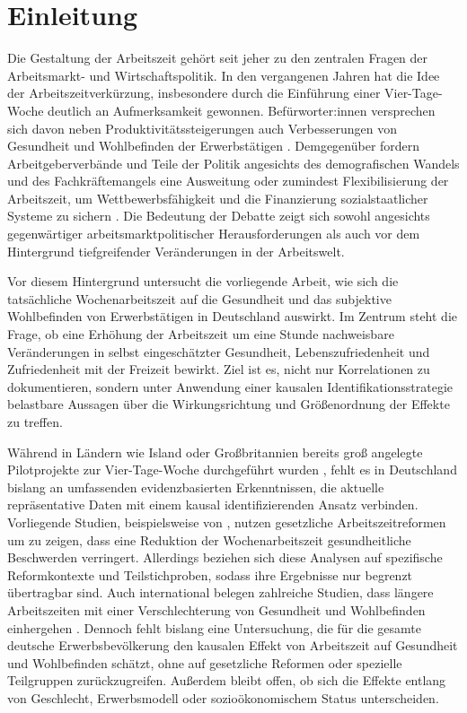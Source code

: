 \documentclass[12pt,a4paper]{article}
\begin{document}
\clearpage
\tableofcontents



\clearpage
{} 
\setcounter{page}{1}
\section{Einleitung}
\sloppy
Die Gestaltung der Arbeitszeit gehört seit jeher zu den zentralen Fragen der Arbeitsmarkt- und Wirtschaftspolitik. In den vergangenen Jahren hat die Idee der Arbeitszeitverkürzung, insbesondere durch die Einführung einer Vier-Tage-Woche deutlich an Aufmerksamkeit gewonnen. Befürworter:innen versprechen sich davon neben Produktivitätssteigerungen auch Verbesserungen von Gesundheit und Wohlbefinden der Erwerbstätigen \parencite{dgbbayern2023}. Demgegenüber fordern Arbeitgeberverbände und Teile der Politik angesichts des demografischen Wandels und des Fachkräftemangels eine Ausweitung oder zumindest Flexibilisierung der Arbeitszeit, um Wettbewerbsfähigkeit und die Finanzierung sozialstaatlicher Systeme zu sichern \parencite{spiegel2023}. Die Bedeutung der Debatte zeigt sich sowohl angesichts gegenwärtiger arbeitsmarktpolitischer Herausforderungen als auch vor dem Hintergrund tiefgreifender Veränderungen in der Arbeitswelt.
\par
\fussy
Vor diesem Hintergrund untersucht die vorliegende Arbeit, wie sich die tatsächliche Wochenarbeitszeit auf die Gesundheit und das subjektive Wohlbefinden von Erwerbstätigen in Deutschland auswirkt. Im Zentrum steht die Frage, ob eine Erhöhung der Arbeitszeit um eine Stunde nachweisbare Veränderungen in selbst eingeschätzter Gesundheit, Lebenszufriedenheit und Zufriedenheit mit der Freizeit bewirkt. Ziel ist es, nicht nur Korrelationen zu dokumentieren, sondern unter Anwendung einer kausalen Identifikationsstrategie belastbare Aussagen über die Wirkungsrichtung und Größenordnung der Effekte zu treffen. 

Während in Ländern wie Island oder Großbritannien bereits groß angelegte Pilotprojekte zur Vier-Tage-Woche durchgeführt wurden \parencite{haraldsson2021,lewis2023}, fehlt es in Deutschland bislang an umfassenden evidenzbasierten Erkenntnissen, die aktuelle repräsentative Daten mit einem kausal identifizierenden Ansatz verbinden. Vorliegende Studien, beispielsweise von \textcite{cyganrehm2018}, nutzen gesetzliche Arbeitszeitreformen um zu zeigen, dass eine Reduktion der Wochenarbeitszeit gesundheitliche Beschwerden verringert. Allerdings beziehen sich diese Analysen auf spezifische Reformkontexte und Teilstichproben, sodass ihre Ergebnisse nur begrenzt übertragbar sind. Auch international belegen zahlreiche Studien, dass längere Arbeitszeiten mit einer Verschlechterung von Gesundheit und Wohlbefinden einhergehen \parencite{berniell2020,lepinteur2019}. Dennoch fehlt bislang eine Untersuchung, die für die gesamte deutsche Erwerbsbevölkerung den kausalen Effekt von Arbeitszeit auf Gesundheit und Wohlbefinden schätzt, ohne auf gesetzliche Reformen oder spezielle Teilgruppen zurückzugreifen. Außerdem bleibt offen, ob sich die Effekte entlang von Geschlecht, Erwerbsmodell oder sozioökonomischem Status unterscheiden.
\end{document}
